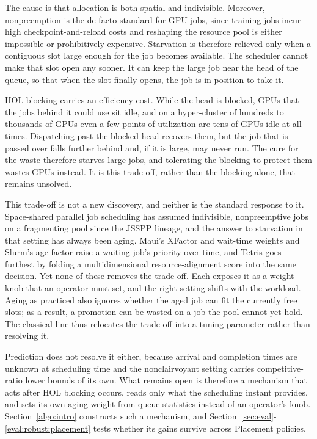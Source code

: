 \documentclass{ieeetj}
\begin{document}
The cause is that allocation is both spatial and indivisible. Moreover, nonpreemption is the de facto standard for GPU jobs, since training jobs incur high checkpoint-and-reload costs and reshaping the resource pool is either impossible or prohibitively expensive. Starvation is therefore relieved only when a contiguous slot large enough for the job becomes available. The scheduler cannot make that slot open any sooner. It can keep the large job near the head of the queue, so that when the slot finally opens, the job is in position to take it.

HOL blocking carries an efficiency cost. While the head is blocked, GPUs that the jobs behind it could use sit idle, and on a hyper-cluster of hundreds to thousands of GPUs even a few points of utilization are tens of GPUs idle at all times. Dispatching past the blocked head recovers them, but the job that is passed over falls further behind and, if it is large, may never run. The cure for the waste therefore starves large jobs, and tolerating the blocking to protect them wastes GPUs instead. It is this trade-off, rather than the blocking alone, that remains unsolved.

This trade-off is not a new discovery, and neither is the standard response to it. Space-shared parallel job scheduling has assumed indivisible, nonpreemptive jobs on a fragmenting pool since the JSSPP lineage\cite{feitelson1996toward}, and the answer to starvation in that setting has always been aging. Maui's XFactor and wait-time weights\cite{jackson2001maui} and Slurm's age factor raise a waiting job's priority over time, and Tetris\cite{grandl2014multi} goes furthest by folding a multidimensional resource-alignment score into the same decision. Yet none of these removes the trade-off. Each exposes it as a weight knob that an operator must set, and the right setting shifts with the workload. Aging as practiced also ignores whether the aged job can fit the currently free slots; as a result, a promotion can be wasted on a job the pool cannot yet hold. The classical line thus relocates the trade-off into a tuning parameter rather than resolving it.

Prediction does not resolve it either, because arrival and completion times are unknown at scheduling time and the nonclairvoyant setting carries competitive-ratio lower bounds of its own\cite{motwani1994nonclairvoyant}. What remains open is therefore a mechanism that acts after HOL blocking occurs, reads only what the scheduling instant provides, and sets its own aging weight from queue statistics instead of an operator's knob. Section~\ref{algo:intro} constructs such a mechanism, and Section~\ref{sec:eval}-\ref{eval:robust:placement} tests whether its gains survive across Placement policies.
\end{document}
